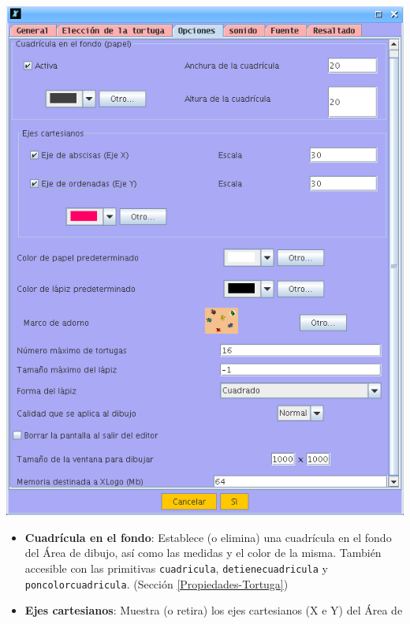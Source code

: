 \begin{itemize}
\begin{itemize}
\begin{center}
               \includegraphics[scale=0.3]{Imagenes/03_Opciones-Menu/Preferencias_03.png}
            \end{center}
            \begin{itemize}
               \item \textbf{Cuadr\'icula en el fondo}:
                  Establece (o elimina) una cuadr\'icula en el fondo del
                  \'Area de dibujo, as\'i como las medidas y el color de la
                  misma. Tambi\'en accesible con las primitivas 
                  \texttt{cuadricula},
                  \texttt{detienecuadricula} y \texttt{poncolorcuadricula}.
                  (Secci\'on \ref{Propiedades-Tortuga})
               \item \textbf{Ejes cartesianos}:
                  Muestra (o retira) los ejes cartesianos (X e Y) del \'Area de

\end{itemize}
\end{itemize}
\end{itemize}
